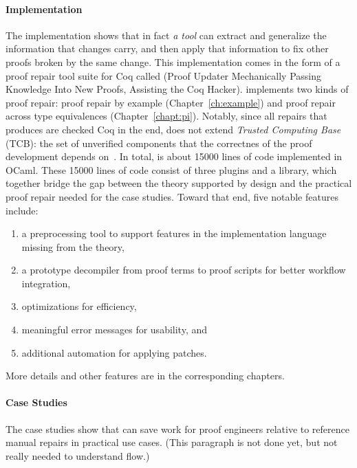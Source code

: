 \paragraph{Implementation}
The implementation shows that in fact \textit{a tool} can extract and generalize the information that changes carry,
and then apply that information to fix other proofs broken by the same change.
This implementation comes in the form of a proof repair tool suite for Coq called \sysnamelong (Proof Updater Mechanically Passing Knowledge Into New Proofs, Assisting the Coq Hacker).
\sysnamelong implements two kinds of proof repair: proof repair by example (Chapter~\ref{ch:example}) %
and proof repair across type equivalences (Chapter~\ref{chapt:pi}). %
Notably, since all repairs that \sysnamelong produces are checked Coq in the end, \sysnamelong does not extend \textit{Trusted Computing Base} (TCB):
the set of unverified components that the correctnes of the proof development depends on~\cite{TODO}. %
In total, \sysnamelong is about 15000 lines of code implemented in OCaml.
These 15000 lines of code consist of three plugins and a library,
which together bridge the gap between the theory supported by design and the practical proof repair needed for the case studies.
Toward that end, five notable features include:

\begin{enumerate}
\item a preprocessing tool to support features in the implementation language missing from the theory,
\item a prototype decompiler from proof terms to proof scripts for better workflow integration,
\item optimizations for efficiency,
\item meaningful error messages for usability, and
\item additional automation for applying patches. 
\end{enumerate}
More details and other features are in the corresponding chapters. %

\paragraph{Case Studies}
The case studies show that \sysnamelong can save work for proof engineers relative to reference manual repairs in practical use cases. %
(This paragraph is not done yet, but not really needed to understand flow.)



